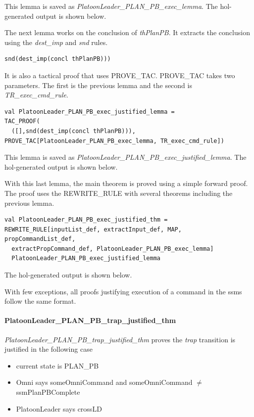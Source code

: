 \documentclass[../../main/main.tex]{subfiles}
\begin{document}
This lemma is saved as \textit{PlatoonLeader_PLAN_PB_exec_lemma}.  The \gls{hol}-generated output is shown below.

\HOLssmPBIntegratedTheoremsPlatoonLeaderXXPLANXXPBXXexecXXlemma

The next lemma works on the conclusion of \textit{thPlanPB}.  It extracts the conclusion using the \textit{dest_imp} and \textit{snd} rules. 

\begin{lstlisting}
snd(dest_imp(concl thPlanPB)))
\end{lstlisting}

 It is also a tactical proof that uses PROVE_TAC.  PROVE_TAC takes two parameters. The first is the previous lemma and the second is \textit{TR_exec_cmd_rule}.  

\begin{lstlisting}
val PlatoonLeader_PLAN_PB_exec_justified_lemma =
TAC_PROOF(
  ([],snd(dest_imp(concl thPlanPB))),
PROVE_TAC[PlatoonLeader_PLAN_PB_exec_lemma, TR_exec_cmd_rule])
\end{lstlisting}

This lemma is saved as \textit{PlatoonLeader_PLAN_PB_exec_justified_lemma}.  The \gls{hol}-generated output is shown below.

\HOLssmPBIntegratedTheoremsPlatoonLeaderXXPLANXXPBXXexecXXjustifiedXXlemma


With this last lemma, the main theorem is proved using a simple forward proof.  The proof uses the REWRITE_RULE with several theorems including the previous lemma. 

\begin{lstlisting}
val PlatoonLeader_PLAN_PB_exec_justified_thm =
REWRITE_RULE[inputList_def, extractInput_def, MAP, propCommandList_def,
  extractPropCommand_def, PlatoonLeader_PLAN_PB_exec_lemma]
  PlatoonLeader_PLAN_PB_exec_justified_lemma
\end{lstlisting}

The \gls{hol}-generated output is shown below.
\HOLssmPBIntegratedTheoremsPlatoonLeaderXXPLANXXPBXXexecXXjustifiedXXthm

With few exceptions, all proofs justifying execution of a command in the \glspl{ssm} follow the same format.

\paragraph*{PlatoonLeader_PLAN_PB_trap_justified_thm}
\textit{PlatoonLeader_PLAN_PB_trap_justified_thm} proves the \textit{trap} transition is justified in the following case
\begin{itemize}
\item current state is PLAN_PB
\item Omni says someOmniCommand and someOmniCommand $\neq$ ssmPlanPBComplete
\item PlatoonLeader says crossLD
\end{itemize}
\end{document}
